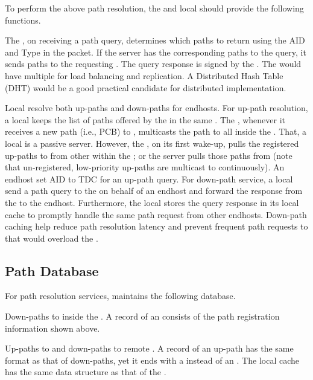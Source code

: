 To perform the above path resolution, the \TDC \PS and local \PS should provide the following functions.

\noindent {\bf \TDC \PS: } The \TDC \PS, on receiving a path query, determines which paths to return using the AID and Type in the packet. If the server has the corresponding paths to the query, it sends paths to the requesting \AD. The query response is signed by the \TDC \PS.  The \TDC would have multiple \PSs for load balancing and replication. A Distributed Hash Table (DHT) would be a good practical candidate for distributed \PS implementation. 


 Local \PSs resolve both up-paths and down-paths for endhosts. For up-path resolution, a local \PS keeps the list of paths offered by the \BS in the same \AD. The \BS, whenever it receives a new path (i.e., PCB) to \TDC,  multicasts the path to all \PSs inside the \AD. That, a local \PS is a passive server. However, the \PS, on its first wake-up, pulls the registered up-paths to \TDC from other \PSs within the \AD; or the server pulls those paths from \TDC (note that un-registered, low-priority up-paths are multicast to \PSs continuously). An endhost set AID to TDC for an up-path query. For down-path service, a local \PS send a path query to the \TDC on behalf of an endhost and forward the response from the \TDC to the endhost. Furthermore, the local \PS stores the query response in its local cache to promptly handle the same path request from other endhosts. Down-path caching help reduce path resolution latency and prevent frequent path requests to \TDC that would overload the \TDC \PSs.



\subsection{Path Database}
For path resolution services, \PSs maintains the following database.

\noindent {\bf \TDC \PS: } Down-paths to \STUB \ADs inside the \TD. \newline
A record of an \STUB \AD consists of the path registration information shown above.

 Up-paths to \TDC and down-paths to remote \STUB \ADs.
A record of an up-path has the same format as that of down-paths, yet it ends with a \TDC \AD instead of an \STUB \AD. The local \PS cache has the same data structure as that of the \TDC \PS.

